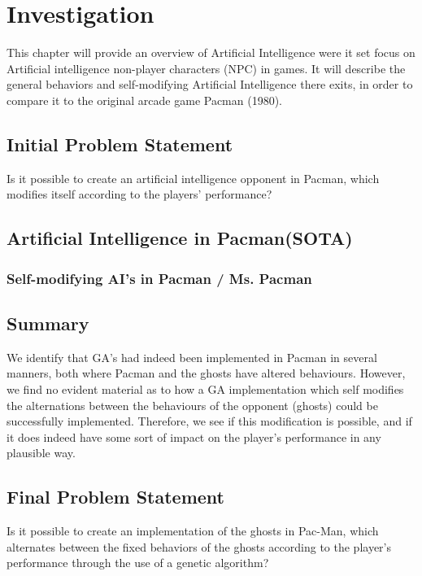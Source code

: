 \section{Investigation} \label{sec:preanalysus}
This chapter will provide an overview of Artificial Intelligence were it set focus on Artificial intelligence non-player characters (NPC) in games. It will describe the general behaviors and self-modifying Artificial Intelligence there exits, in order to compare it to the original arcade game Pacman (1980).


\subsection{Initial Problem Statement} \label{sec:initialproblemstatement}
Is it possible to create an artificial intelligence opponent in Pacman, which modifies itself according to the players' performance?



\subsection{Artificial Intelligence in Pacman(SOTA)}



\subsubsection{Self-modifying AI's in Pacman / Ms. Pacman}

\subsection{Summary}
We identify that GA’s had indeed been implemented in Pacman in several manners, both where Pacman and the ghosts have altered behaviours. However, we find no evident material as to how a GA implementation which self modifies the alternations between the behaviours of the opponent (ghosts) could be successfully implemented. Therefore, we see if this modification is possible, and if it does indeed have some sort of impact on the player’s performance in any plausible way.


\subsection{Final Problem Statement} \label{sec:finalproblemstatement}
Is it possible to create an implementation of the ghosts in Pac-Man, which alternates between the fixed behaviors of the ghosts according to the player's performance through the use of a genetic algorithm?